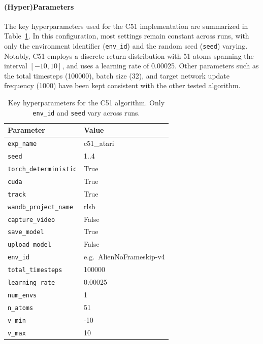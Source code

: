 \paragraph{(Hyper)Parameters}
The key hyperparameters used for the C51 implementation are summarized in Table~\ref{tab:c51_hyperparams}. In this configuration, most settings remain constant across runs, with only the environment identifier (\texttt{env\_id}) and the random seed (\texttt{seed}) varying. Notably, C51 employs a discrete return distribution with 51 atoms spanning the interval $[-10, 10]$, and uses a learning rate of \num{0.00025}. Other parameters such as the total timesteps (\num{100000}), batch size (32), and target network update frequency (\num{1000}) have been kept consistent with the other tested algorithm. 

\begin{table}
	\caption{Key hyperparameters for the C51 algorithm. Only \texttt{env\_id} and \texttt{seed} vary across runs.}
	\label{tab:c51_hyperparams}
	\centering
	\begin{tabular}{ll}
		\toprule
		\textbf{Parameter} & \textbf{Value} \\
		\midrule
		\texttt{exp\_name}                & c51\_atari \\
		\texttt{seed}                     & 1..4 \\
		\texttt{torch\_deterministic}     & True \\
		\texttt{cuda}                     & True \\
		\texttt{track}                    & True \\
		\texttt{wandb\_project\_name}     & rlsb \\
		\texttt{capture\_video}           & False \\
		\texttt{save\_model}              & True \\
		\texttt{upload\_model}            & False \\
		\texttt{env\_id}                  & e.g.\ AlienNoFrameskip-v4 \\
		\texttt{total\_timesteps}         & 100000 \\
		\texttt{learning\_rate}           & 0.00025 \\
		\texttt{num\_envs}                & 1 \\
		\texttt{n\_atoms}                 & 51 \\
		\texttt{v\_min}                   & -10 \\
		\texttt{v\_max}                   & 10 \\

\end{tabular}
\end{table}
